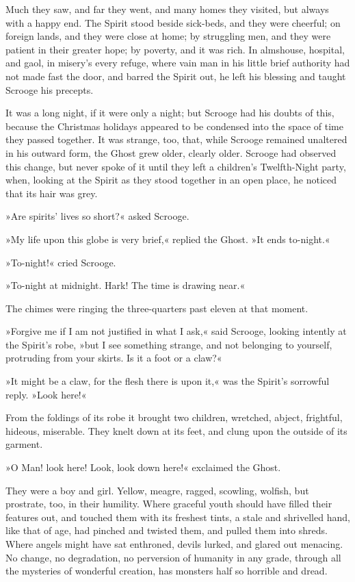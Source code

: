 Much they saw, and far they went, and many homes they visited, but always with a happy end. The Spirit stood beside sick-beds, and they were cheerful; on foreign lands, and they were close at home; by struggling men, and they were patient in their greater hope; by poverty, and it was rich. In almshouse, hospital, and gaol, in misery's every refuge, where vain man in his little brief authority had not made fast the door, and barred the Spirit out, he left his blessing and taught Scrooge his precepts.

It was a long night, if it were only a night; but Scrooge had his doubts of this, because the Christmas holidays appeared to be condensed into the space of time they passed together. It was strange, too, that, while Scrooge remained unaltered in his outward form, the Ghost grew older, clearly older. Scrooge had observed this change, but never spoke of it until they left a children's Twelfth-Night party, when, looking at the Spirit as they stood together in an open place, he noticed that its hair was grey.

»Are spirits' lives so short?« asked Scrooge.

»My life upon this globe is very brief,« replied the Ghost. »It ends to-night.«

»To-night!« cried Scrooge.

»To-night at midnight. Hark! The time is drawing near.«

The chimes were ringing the three-quarters past eleven at that moment.

»Forgive me if I am not justified in what I ask,« said Scrooge, looking intently at the Spirit's robe, »but I see something strange, and not belonging to yourself, protruding from your skirts. Is it a foot or a claw?«

»It might be a claw, for the flesh there is upon it,« was the Spirit's sorrowful reply. »Look here!«

From the foldings of its robe it brought two children, wretched, abject, frightful, hideous, miserable. They knelt down at its feet, and clung upon the outside of its garment.

»O Man! look here! Look, look down here!« exclaimed the Ghost.

They were a boy and girl. Yellow, meagre, ragged, scowling, wolfish, but prostrate, too, in their humility. Where graceful youth should have filled their features out, and touched them with its freshest tints, a stale and shrivelled hand, like that of age, had pinched and twisted them, and pulled them into shreds. Where angels might have sat enthroned, devils lurked, and glared out menacing. No change, no degradation, no perversion of humanity in any grade, through all the mysteries of wonderful creation, has monsters half so horrible and dread.

